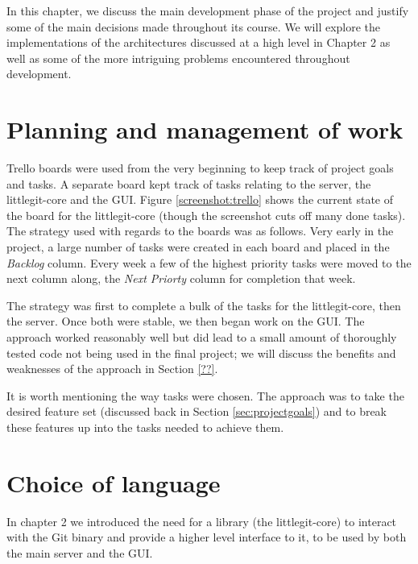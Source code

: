In this chapter, we discuss the main development phase of the project and justify some of the main decisions made throughout its course. We will explore the implementations of the architectures discussed at a high level in Chapter 2 as well as some of the more intriguing problems encountered throughout development.


\section{Planning and management of work}

Trello boards were used from the very beginning to keep track of project goals and tasks. A separate board kept track of tasks relating to the server, the littlegit-core and the GUI. Figure \ref{screenshot:trello} shows the current state of the board for the littlegit-core (though the screenshot cuts off many done tasks). The strategy used with regards to the boards was as follows. Very early in the project, a large number of tasks were created in each board and placed in the \emph{Backlog} column. Every week a few of the highest priority tasks were moved to the next column along, the \emph{Next Priorty} column for completion that week. 


The strategy was first to complete a bulk of the tasks for the littlegit-core, then the server. Once both were stable, we then began work on the GUI. The approach worked reasonably well but did lead to a small amount of thoroughly tested code not being used in the final project; we will discuss the benefits and weaknesses of the approach in Section \ref{??}.

It is worth mentioning the way tasks were chosen. The approach was to take the desired feature set (discussed back in Section \ref{sec:projectgoals}) and to break these features up into the tasks needed to achieve them. 

\section{Choice of language}

In chapter 2 we introduced the need for a library (the littlegit-core) to interact with the Git binary and provide a higher level interface to it, to be used by both the main server and the GUI. 

